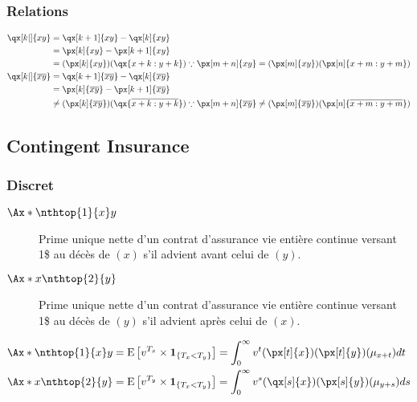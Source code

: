 \documentclass[10pt, french]{article}
\begin{document}
\begin{multicols*}{2}
\subsubsection*{Relations}
	\setlength{\mathindent}{-1cm}
\begin{align*}
	\qx[k|]{xy}
	&=	\qx[k + 1]{xy}	-	\qx[k]{xy}	\\
	&=	\px[k]{xy}	-	\px[k + 1]{xy}	\\
	&=	(\px[k]{xy})(\qx{x + k : y + k})		\because		\px[m + n]{xy} = (\px[m]{xy})(\px[n]{x + m : y + m})	\\
	\qx[k|]{\overline{xy}}
	&=	\qx[k + 1]{\overline{xy}}	-	\qx[k]{\overline{xy}}	\\
	&=	\px[k]{\overline{xy}}	-	\px[k + 1]{\overline{xy}}	\\
	&\neq	(\px[k]{\overline{xy}})(\qx{\overline{x + k : y + k}})	\because		\px[m + n]{\overline{xy}} \neq (\px[m]{\overline{xy}})(\px[n]{\overline{x + m : y + m}})	\\
\end{align*}
	\setlength{\mathindent}{1cm}

\columnbreak

\subsection*{Contingent Insurance}
\subsubsection*{Discret}
\begin{distributions}[Notation]
\begin{description}
	\item[$\Ax*{\nthtop{1}{x}y}$]	Prime unique nette d'un contrat d'assurance vie entière continue versant 1\$ au décès de $(x)$ s'il advient avant celui de $(y)$.
	\item[$\Ax*{x\nthtop{2}{y}}$]	Prime unique nette d'un contrat d'assurance vie entière continue versant 1\$ au décès de $(y)$ s'il advient après celui de $(x)$.
\end{description}
\end{distributions}
\begin{align*}
	\Ax*{\nthtop{1}{x}y}
	&=	\esp{v^{T_{x}} \times \bm{1}_{\{T_{x} < T_{y}\}}}
	=	\int_{0}^{\infty} v^{t} (\px[t]{x})(\px[t]{y})(\mu_{x + t})dt	\\
	\Ax*{x\nthtop{2}{y}}
	&=	\esp{v^{T_{y}} \times \bm{1}_{\{T_{x} < T_{y}\}}}
	=	\int_{0}^{\infty} v^{s} (\qx[s]{x})(\px[s]{y})(\mu_{y + s})ds
\end{align*}


\end{multicols*}
\end{document}

